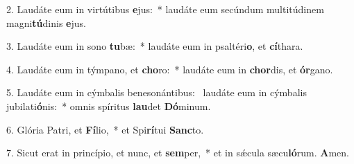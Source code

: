 2. Laudáte eum in virtútibus \textbf{e}jus:~*  laudáte eum secúndum multitúdinem magni\textbf{tú}dinis \textbf{e}jus.\

3. Laudáte eum in sono \textbf{tu}bæ:~*  laudáte eum in psaltéri\textbf{o}, et \textbf{cí}thara.\

4. Laudáte eum in týmpano, et \textbf{cho}ro:~*  laudáte eum in \textbf{chor}dis, et \textbf{ór}gano.\

5. Laudáte eum in cýmbalis benesonántibus: \dag\  laudáte eum in cýmbalis jubilati\textbf{ó}nis:~*  omnis spíritus \textbf{lau}det \textbf{Dó}minum.\

6. Glória Patri, et \textbf{Fí}lio,~*  et Spi\textbf{rí}tui \textbf{Sanc}to.\

7. Sicut erat in princípio, et nunc, et \textbf{sem}per,~*  et in sǽcula sæcu\textbf{ló}rum. \textbf{A}men.\

